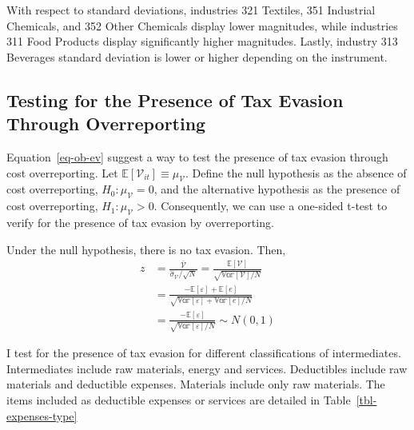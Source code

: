 \documentclass[
  12pt]{article}
\theoremstyle{definition}
\theoremstyle{remark}
\begin{document}
With respect to standard deviations, industries 321 Textiles, 351
Industrial Chemicals, and 352 Other Chemicals display lower magnitudes,
while industries 311 Food Products display significantly higher
magnitudes. Lastly, industry 313 Beverages standard deviation is lower
or higher depending on the instrument.

\subsection{Testing for the Presence of Tax Evasion Through
Overreporting}\label{sec-tax-ev-test}

Equation~\ref{eq-ob-ev} suggest a way to test the presence of tax
evasion through cost overreporting. Let
\(\mathbb{E}[\mathcal{V}_{it}]\equiv \mu_{\mathcal{V}}\). Define the
null hypothesis as the absence of cost overreporting,
\(H_0: \mu_{\mathcal{V}}=0\), and the alternative hypothesis as the
presence of cost overreporting, \(H_1: \mu_{\mathcal{V}}>0\).
Consequently, we can use a one-sided t-test to verify for the presence
of tax evasion by overreporting.

Under the null hypothesis, there is no tax evasion. Then, \[
\begin{aligned}  
  z &= \frac{\bar{\mathcal{V}}}{\hat\sigma_{\mathcal{V}}/\sqrt{N}}=\frac{\mathbb{E}[\mathcal{V}]}{\sqrt{\mathbb{Var}[\mathcal{V}]/N}}\\
  &=\frac{-\mathbb{E}[\varepsilon]+\mathbb{E}[e]}{\sqrt{\mathbb{Var}[\varepsilon]+\mathbb{Var}[e]/N}}\\
  &= \frac{-\mathbb{E}[\varepsilon]}{\sqrt{\mathbb{Var}[\varepsilon]/N}}\sim N(0,1)
\end{aligned}
\]

I test for the presence of tax evasion for different classifications of
intermediates. Intermediates include raw materials, energy and services.
Deductibles include raw materials and deductible expenses. Materials
include only raw materials. The items included as deductible expenses or
services are detailed in Table~\ref{tbl-expenses-type}
\end{document}
